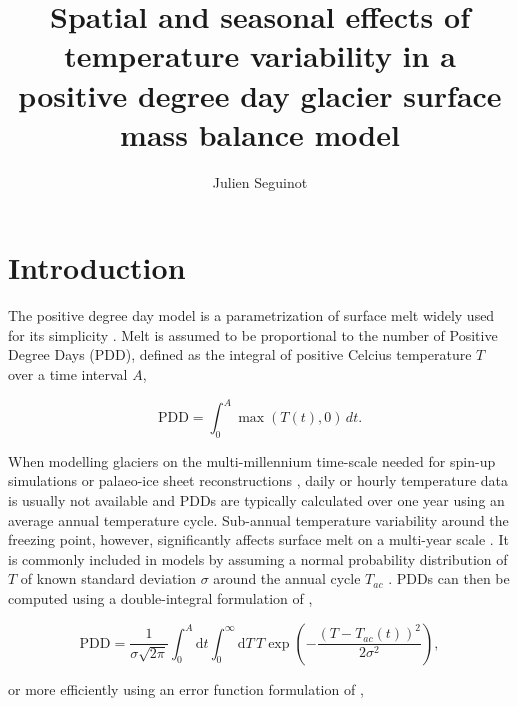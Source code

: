 \documentclass[review]{igs}
\begin{document}
\title[Temperature variability in a positive degree day model]{Spatial and seasonal effects of temperature variability in a positive degree day glacier surface mass balance model}
\author[J. Seguinot]{Julien Seguinot}

\maketitle


\section{Introduction}

The positive degree day model is a parametrization of surface melt widely used for its simplicity \citep{hock-2003}. Melt is assumed to be proportional to the number of Positive Degree Days (PDD), defined as the integral of positive Celcius temperature $T$ over a time interval $A$,

\begin{equation} \label{eq:pdd}
  \mathrm{PDD} = \int_{0}^{A}\max(T(t),0)\,dt.
\end{equation}

When modelling glaciers on the multi-millennium time-scale needed for spin-up simulations or palaeo-ice sheet reconstructions \citep[e.g.][]{charbit-etal-2013}, daily or hourly temperature data is usually not available and PDDs are typically calculated over one year using an average annual temperature cycle. Sub-annual temperature variability around the freezing point, however, significantly affects surface melt on a multi-year scale \citep{arnold-mackay-1964}. It is commonly included in models by assuming a normal probability distribution of $T$ of known standard deviation $\sigma$ around the annual cycle $T_{ac}$ \citep{braithwaite-1984}. PDDs can then be computed using a double-integral formulation of \citet{reeh-1991},

\begin{equation} \label{eq:reeh}
  \mathrm{PDD} = \frac{1}{\sigma\sqrt{2\pi}}
    \int_{0}^{A} \mathrm{d}t
    \int_{0}^{\infty} \mathrm{d}T \,
    T \exp\left({-\frac{(T-T_{ac}(t))^2}{2\sigma^2}}\right),
\end{equation}

or more efficiently using an error function formulation of \citet{calov-greve-2005},
\end{document}

